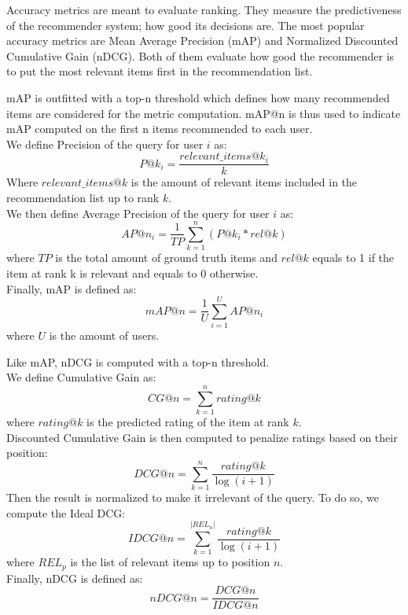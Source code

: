 Accuracy metrics are meant to evaluate ranking. They measure the predictiveness of the recommender system; how good its decisions are. The most popular accuracy metrics are Mean Average Precision (mAP) and Normalized Discounted Cumulative Gain (nDCG). Both of them evaluate how good the recommender is to put the most relevant items first in the recommendation list.\par
mAP is outfitted with a top-n threshold which defines how many recommended items are considered for the metric computation. mAP@n is thus used to indicate mAP computed on the first n items recommended to each user.\\
We define Precision of the query for user $i$ as:
\begin{equation*}
P@k_i = \frac{relevant\_items@k_i}{k}
\end{equation*}
Where $relevant\_items@k$ is the amount of relevant items included in the recommendation list up to rank $k$.\\
We then define Average Precision of the query for user $i$ as:
\begin{equation*}
AP@n_i = \frac{1}{TP} \sum_{k=1}^{n} (P@k_i * rel@k)
\end{equation*}
where $TP$ is the total amount of ground truth items and $rel@k$ equals to 1 if the item at rank k is relevant and equals to 0 otherwise.\\
Finally, mAP is defined as:
\begin{equation*}
mAP@n = \frac{1}{U} \sum_{i=1}^{U} AP@n_i
\end{equation*}
where $U$ is the amount of users.\par
Like mAP, nDCG is computed with a top-n threshold.\\
We define Cumulative Gain as:
\begin{equation*}
CG@n = \sum_{k=1}^{n} rating@k
\end{equation*}
where $rating@k$ is the predicted rating of the item at rank $k$.\\
Discounted Cumulative Gain is then computed to penalize ratings based on their position:
\begin{equation*}
DCG@n = \sum_{k=1}^{n} \frac{rating@k}{\log(i+1)}
\end{equation*}
Then the result is normalized to make it irrelevant of the query. To do so, we compute the Ideal DCG:
\begin{equation*}
IDCG@n = \sum_{k=1}^{|REL_n|} \frac{rating@k}{\log(i+1)}
\end{equation*}
where $REL_p$ is the list of relevant items up to position $n$.\\
Finally, nDCG is defined as:
\begin{equation*}
nDCG@n = \frac{DCG@n}{IDCG@n}
\end{equation*}


